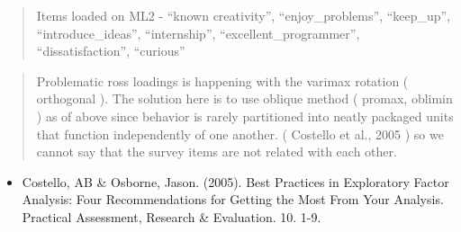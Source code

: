 \documentclass[
]{article}
\providecommand{\tightlist}{%
  \setlength{\itemsep}{0pt}\setlength{\parskip}{0pt}}
\begin{document}
\begin{quote}
Items loaded on ML2 - ``known creativity'', ``enjoy\_problems'',
``keep\_up'', ``introduce\_ideas'', ``internship'',
``excellent\_programmer'', ``dissatisfaction'', ``curious''
\end{quote}

\begin{quote}
Problematic ross loadings is happening with the varimax rotation (
orthogonal ). The solution here is to use oblique method ( promax,
oblimin ) as of above since behavior is rarely partitioned into neatly
packaged units that function independently of one another. ( Costello et
al., 2005 ) so we cannot say that the survey items are not related with
each other.
\end{quote}

\begin{itemize}
\tightlist
\item
  Costello, AB \& Osborne, Jason. (2005). Best Practices in Exploratory
  Factor Analysis: Four Recommendations for Getting the Most From Your
  Analysis. Practical Assessment, Research \& Evaluation. 10. 1-9.
\end{itemize}
\end{document}
